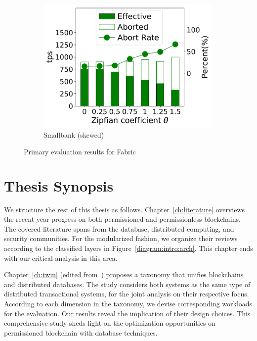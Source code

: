 \begin{figure}[tp]
\begin{subfigure}{0.30\textwidth}
      \includegraphics[width=0.99\textwidth]{chart/intro/smallbank_skew.pdf}
      \caption{Smallbank (skewed)}
      \label{chart:intro:basic:smallbank_skew}
    \end{subfigure}
    \caption{Primary evaluation results for Fabric }
    \label{chart:intro:basic}
\end{figure}

\section{Thesis Synopsis}
We structure the rest of this thesis as follows. Chapter~\ref{ch:literature} overviews the recent year progress on both permissioned and permissionless blockchains. The covered literature spans from the database, distributed computing, and security communities. For the modularized fashion, we organize their reviews according to the classified layers in Figure~\ref{diagram:intro:arch}. This chapter ends with our critical analysis in this area. 

Chapter~\ref{ch:twin} (edited from~\cite{ruan2019blockchains}) proposes a taxonomy that unifies blockchains and distributed databases. 
The study considers both systems as the same type of distributed transactional systems, for the joint analysis on their respective focus. 
According to each dimension in the taxonomy, we devise corresponding workloads for the evaluation. 
Our results reveal the implication of their design choices. 
This comprehensive study sheds light on the optimization opportunities on permissioned blockchain with database techniques. 

